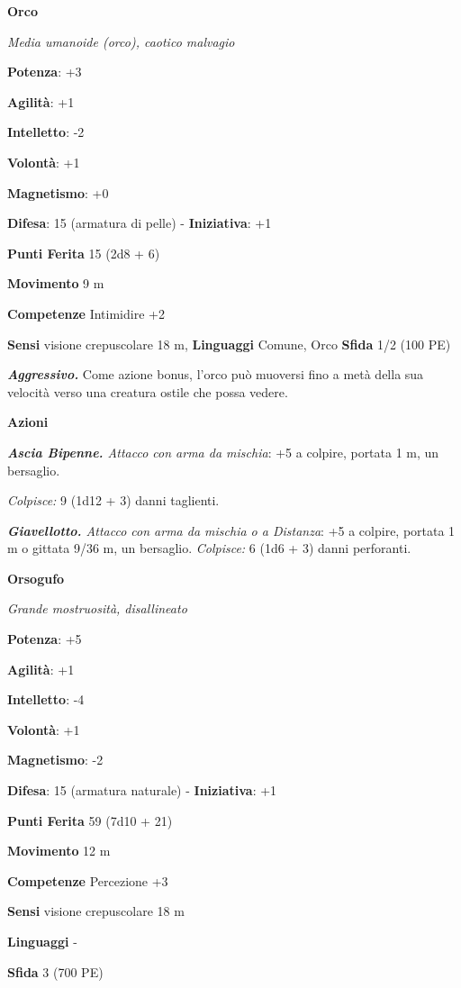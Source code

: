 \begin{multicols}{2}
\textbf{Orco}

\emph{Media umanoide (orco), caotico malvagio}

\textbf{Potenza}: +3

\textbf{Agilità}: +1

\textbf{Intelletto}: -2

\textbf{Volontà}: +1

\textbf{Magnetismo}: +0

\textbf{Difesa}: 15 (armatura di pelle) - \textbf{Iniziativa}: +1

\textbf{Punti Ferita} 15 (2d8 + 6)

\textbf{Movimento} 9 m

\textbf{Competenze} Intimidire +2

\textbf{Sensi} visione crepuscolare 18 m, 
\textbf{Linguaggi} Comune, Orco \textbf{Sfida} 1/2 (100 PE)\smallskip

\emph{\textbf{Aggressivo.}} Come azione bonus, l'orco può muoversi fino
a metà della sua velocità verso una creatura ostile che possa vedere.

\smallskip\textbf{Azioni}

\emph{\textbf{Ascia Bipenne.} Attacco con arma da mischia}: +5 a
colpire, portata 1 m, un bersaglio.

\emph{Colpisce:} 9 (1d12 + 3) danni taglienti.

\emph{\textbf{Giavellotto.} Attacco con arma da mischia o a Distanza}:
+5 a colpire, portata 1 m o gittata 9/36 m, un bersaglio.
\emph{Colpisce:} 6 (1d6 + 3) danni perforanti.

\textbf{Orsogufo}

\emph{Grande mostruosità, disallineato}

\textbf{Potenza}: +5

\textbf{Agilità}: +1

\textbf{Intelletto}: -4

\textbf{Volontà}: +1

\textbf{Magnetismo}: -2

\textbf{Difesa}: 15 (armatura naturale) - \textbf{Iniziativa}: +1

\textbf{Punti Ferita} 59 (7d10 + 21)

\textbf{Movimento} 12 m

\textbf{Competenze} Percezione +3

\textbf{Sensi} visione crepuscolare 18 m

\textbf{Linguaggi} -

\textbf{Sfida} 3 (700 PE)\smallskip


\end{multicols}
